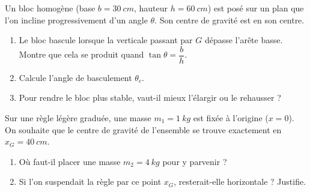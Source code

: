 \documentclass[11pt,a4paper]{article}
\begin{document}
\begin{exo}
Un bloc homogène (base $b=\qty{30}{cm}$, hauteur $h=\qty{60}{cm}$) est posé sur un plan que l'on
incline progressivement d'un angle $\theta$. Son centre de gravité est en son centre.
\begin{center}
\end{center}
\begin{enumerate}[label=\alph*)]
  \item Le bloc bascule lorsque la verticale passant par $G$ dépasse l'arête basse. Montre que cela se
        produit quand $\tan\theta = \dfrac{b}{h}$.
  \item Calcule l'angle de basculement $\theta_c$.
  \item Pour rendre le bloc plus stable, vaut-il mieux l'élargir ou le rehausser ?
\end{enumerate}
\end{exo}

\begin{exo}
Sur une règle légère graduée, une masse $m_1=\qty{1}{kg}$ est fixée à l'origine ($x=0$). On souhaite
que le centre de gravité de l'ensemble se trouve exactement en $x_G=\qty{40}{cm}$.
\begin{enumerate}[label=\alph*)]
  \item Où faut-il placer une masse $m_2=\qty{4}{kg}$ pour y parvenir ?
  \item Si l'on suspendait la règle par ce point $x_G$, resterait-elle horizontale ? Justifie.
\end{enumerate}
\end{exo}
\end{document}
